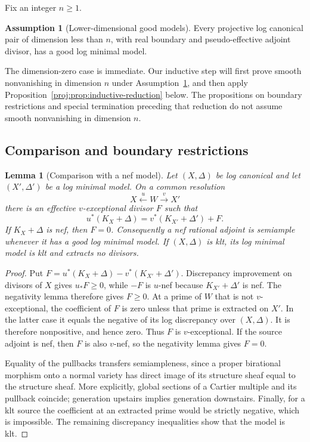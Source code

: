 \documentclass[11pt,letterpaper]{article}
\newtheorem{lemma}[theorem]{Lemma}
\theoremstyle{definition}
\newtheorem{assumption}[theorem]{Assumption}
\theoremstyle{remark}
\begin{document}
Fix an integer \(n\geq 1\).
\begin{assumption}[Lower-dimensional good models]\label{proj:mmp:lower-models}
Every projective log canonical pair of dimension less than \(n\),
with real boundary and pseudo-effective adjoint divisor, has a good
log minimal model.
\end{assumption}

The dimension-zero case is immediate. Our inductive step will first
prove smooth nonvanishing in dimension \(n\) under
Assumption~\ref{proj:mmp:lower-models}, and then apply
Proposition~\ref{proj:prop:inductive-reduction} below.
The propositions on boundary restrictions and special termination
preceding that reduction do not assume smooth nonvanishing in
dimension \(n\).

\subsection{Comparison and boundary restrictions}

\begin{lemma}[Comparison with a nef model]\label{proj:mmp:comparison}
Let \((X,\Delta)\) be log canonical and let \((X',\Delta')\)
be a log minimal model. On a common resolution
\[
 X \xleftarrow{u} W \xrightarrow{v} X'
\]
there is an effective \(v\)-exceptional divisor \(F\) such that
\begin{equation}\label{proj:mmp:comparison-equation}
 u^*(K_X+\Delta)=v^*(K_{X'}+\Delta')+F.
\end{equation}
If \(K_X+\Delta\) is nef, then \(F=0\). Consequently a nef
rational adjoint is semiample whenever it has a good log minimal
model. If \((X,\Delta)\) is klt, its log minimal model is klt and
extracts no divisors.
\end{lemma}

\begin{proof}
Put \(F=u^*(K_X+\Delta)-v^*(K_{X'}+\Delta')\).
Discrepancy improvement on divisors of \(X\) gives \(u_*F\geq 0\),
while \(-F\) is \(u\)-nef because \(K_{X'}+\Delta'\) is nef.
The negativity lemma therefore gives \(F\geq 0\).
At a prime of \(W\) that is not \(v\)-exceptional, the coefficient
of \(F\) is zero unless that prime is extracted on \(X'\).
In the latter case it equals the negative of its log discrepancy
over \((X,\Delta)\). It is therefore nonpositive, and hence zero.
Thus \(F\) is \(v\)-exceptional. If the source adjoint is nef,
then \(F\) is also \(v\)-nef, so the negativity lemma gives \(F=0\).

Equality of the pullbacks transfers semiampleness, since a proper
birational morphism onto a normal variety has direct image of its
structure sheaf equal to the structure sheaf. More explicitly,
global sections of a Cartier multiple and its pullback coincide;
generation upstairs implies generation downstairs.
Finally, for a klt source the coefficient at an extracted prime
would be strictly negative, which is impossible. The remaining
discrepancy inequalities show that the model is klt.
\end{proof}
\end{document}
